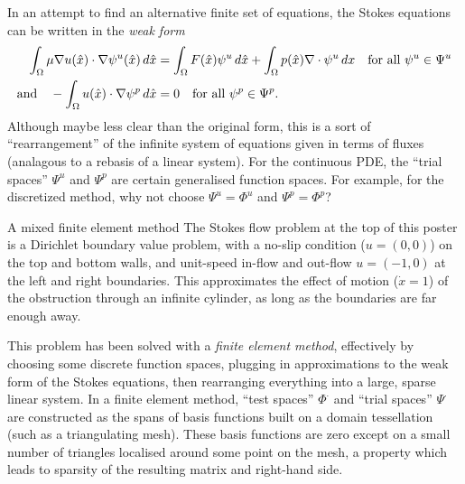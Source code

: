 \documentclass{article}
\begin{document}

In an attempt to find an alternative finite set of equations, the Stokes equations can be written in the \textit{weak form}
\begin{equation}\label{steady_stokes_weak_form}
\begin{split}
        \int_{\Omega} \mu\nabla u(\hat{x})\cdot \nabla\psi^u(\hat{x})\,d\hat{x}
            &= \int_{\Omega}F(\hat{x})\psi^u\,d\hat{x}
            +\int_{\Omega} p(\hat{x})\nabla\cdot\psi^u\,dx \text{\quad for all $\psi^u \in \Psi^u$}\\
    \text{and\quad} -\int_{\Omega}u(\hat{x})\cdot\nabla\psi^p\,d\hat{x} &= 0 \text{\quad for all $\psi^p \in \Psi^p$}.
\end{split}
\end{equation}
Although maybe less clear than the original form, this is a sort of ``rearrangement'' of the infinite system of equations given in terms of fluxes
(analagous to a rebasis of a linear system).
For the continuous PDE, the ``trial spaces'' $\Psi^u$ and $\Psi^p$ are certain generalised function spaces.
For example, for the discretized method, why not choose $\Psi^u = \Phi^u$ and $\Psi^p = \Phi^p$?


\newpage
\vskip 0.2in
{\large A mixed finite element method}
\vskip 0.2in
The Stokes flow problem at the top of this poster is a Dirichlet boundary value problem, with a no-slip condition ($u = (0,0)$) on the top
and bottom walls, and unit-speed in-flow and out-flow $u = (-1,0)$ at the left and right boundaries. This approximates the effect of motion
($\dot{x} = 1$)
of the obstruction through an infinite cylinder, as long as the boundaries are far enough away.

This problem has been solved with a \textit{finite element method}, effectively by choosing some discrete function spaces, plugging in approximations to the weak
form of the Stokes equations, then rearranging everything into a large, sparse linear system.
In a finite element method,
``test spaces'' $\Phi^\cdot$ and ``trial spaces'' $\Psi^\cdot$ are constructed as the spans of basis functions built on a domain tessellation
(such as a triangulating mesh).
These basis functions are zero except on a small number of triangles localised around some point on the mesh, a property which leads to
sparsity of the resulting matrix and right-hand side.
\end{document}
